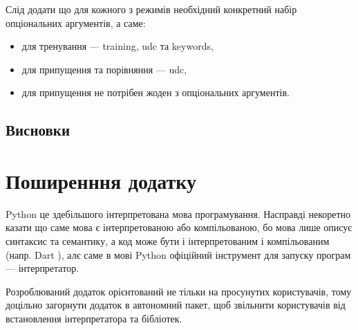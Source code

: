 \documentclass[14pt]{extarticle}
\let\oldsection\section
\renewcommand{\section}{\clearpage\oldsection}
\begin{document}
  Слід додати що для кожного з режимів необхідний конкретний
  набір опціональних аргументів, а саме:
  \begin{itemize}[labelindent=\dimexpr{}\relax, leftmargin=*]
    \item для тренування --- training, udc та keywords,
    \item для припущення та порівняння --- udc,
    \item для припущення не потрібен жоден з опціональних аргументів.
  \end{itemize}

  \subsection{Висновки}

  \section{Поширенння додатку}
  Python це здебільшого інтерпретована мова програмування.
  Насправді некоретно казати що саме мова є інтерпретованою або компільованою,
  бо мова лише описує синтаксис та семантику,
  а код може бути і інтерпретованим і компільованим (напр. Dart \cite{dart_lang}),
  алє саме в мові Python офіційний інструмент для запуску програм ---
  інтерпретатор.
  
  Розроблюваний додаток орієнтований не тільки на просунутих користувачів,
  тому доцільно загорнути додаток в автономний пакет,
  щоб звільнити користувачів від встановлення інтерпретатора та бібліотек.
\end{document}
